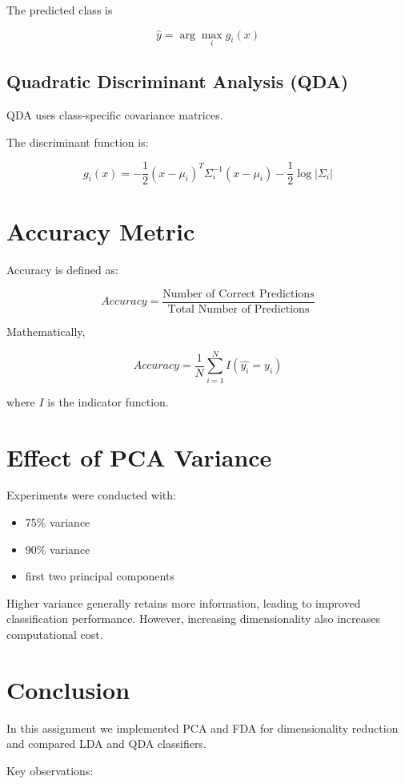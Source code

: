 \documentclass[12pt]{article}
\begin{document}
The predicted class is

\[
\hat{y} = \arg\max_i g_i(x)
\]

\subsection{Quadratic Discriminant Analysis (QDA)}

QDA uses class-specific covariance matrices.

The discriminant function is:

\[
g_i(x) =
-\frac{1}{2}(x-\mu_i)^T\Sigma_i^{-1}(x-\mu_i)
-\frac{1}{2}\log|\Sigma_i|
\]

\section{Accuracy Metric}

Accuracy is defined as:

\[
Accuracy =
\frac{\text{Number of Correct Predictions}}
{\text{Total Number of Predictions}}
\]

Mathematically,

\[
Accuracy =
\frac{1}{N}\sum_{i=1}^{N} I(\hat{y_i} = y_i)
\]

where $I$ is the indicator function.


\section{Effect of PCA Variance}

Experiments were conducted with:

\begin{itemize}
\item 75\% variance
\item 90\% variance
\item first two principal components
\end{itemize}

Higher variance generally retains more information, leading to improved classification performance. However, increasing dimensionality also increases computational cost.

\section{Conclusion}

In this assignment we implemented PCA and FDA for dimensionality reduction and compared LDA and QDA classifiers.

Key observations:
\end{document}
